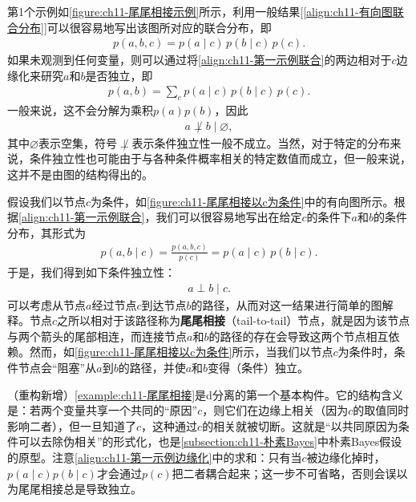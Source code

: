 \documentclass[../../main.tex]{subfiles}
\begin{document}
\begin{example}[ 尾尾相接]\label{example:ch11-尾尾相接}
第1个示例如\cref{figure:ch11-尾尾相接示例}所示，利用一般结果[\eqref{align:ch11-有向图联合分布}]可以很容易地写出该图所对应的联合分布，即
\begin{align}
  p(a,b,c) = p(a\mid c)\,p(b\mid c)\,p(c).
  \label{align:ch11-第一示例联合}
\end{align}
如果未观测到任何变量，则可以通过将\eqref{align:ch11-第一示例联合}的两边相对于$c$边缘化来研究$a$和$b$是否独立，即
\begin{align}
  p(a,b) = \sum_{c}p(a\mid c)\,p(b\mid c)\,p(c).
  \label{align:ch11-第一示例边缘化}
\end{align}
一般来说，这不会分解为乘积$p(a)p(b)$，因此
\begin{align}
  a \not\perp b \mid \varnothing,
  \label{align:ch11-第一示例非独立}
\end{align}
其中$\varnothing$表示空集，符号$\not\perp$表示条件独立性一般不成立。当然，对于特定的分布来说，条件独立性也可能由于与各种条件概率相关的特定数值而成立，但一般来说，这并不是由图的结构得出的。

假设我们以节点$c$为条件，如\cref{figure:ch11-尾尾相接以c为条件}中的有向图所示。根据\eqref{align:ch11-第一示例联合}，我们可以很容易地写出在给定$c$的条件下$a$和$b$的条件分布，其形式为
\begin{align}
  p(a,b\mid c) = \frac{p(a,b,c)}{p(c)} = p(a\mid c)\,p(b\mid c).
\end{align}
于是，我们得到如下条件独立性：
\begin{align}
  a \perp b \mid c.
\end{align}
可以考虑从节点$a$经过节点$c$到达节点$b$的路径，从而对这一结果进行简单的图解释。节点$c$之所以相对于该路径称为\textbf{尾尾相接}（tail-to-tail）节点，就是因为该节点与两个箭头的尾部相连，而连接节点$a$和$b$的路径的存在会导致这两个节点相互依赖。然而，如\cref{figure:ch11-尾尾相接以c为条件}所示，当我们以节点$c$为条件时，条件节点会“阻塞”从$a$到$b$的路径，并使$a$和$b$变得（条件）独立。
\end{example}

\begin{remark}（重构新增）\cref{example:ch11-尾尾相接}是d分离的第一个基本构件。它的结构含义是：若两个变量共享一个共同的“原因”$c$，则它们在边缘上相关（因为$c$的取值同时影响二者），但一旦知道了$c$，这种通过$c$的相关就被切断。这就是“以共同原因为条件可以去除伪相关”的形式化，也是\cref{subsection:ch11-朴素Bayes}中朴素Bayes假设的原型。注意\eqref{align:ch11-第一示例边缘化}中的求和：只有当$c$被边缘化掉时，$p(a\mid c)p(b\mid c)$才会通过$p(c)$把二者耦合起来；这一步不可省略，否则会误以为尾尾相接总是导致独立。
\end{remark}
\end{document}
